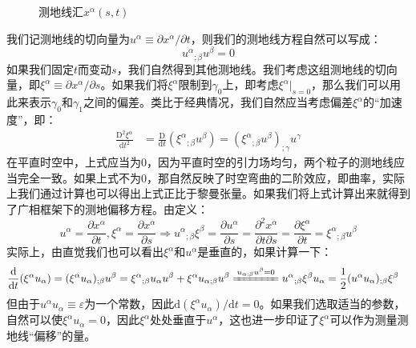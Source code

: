 \documentclass[hyperref, UTF8, a4paper]{ctexart}
\begin{document}
\begin{figure}
	\centering
	
	\caption{测地线汇$x^{\alpha }( s,t)$}
	\label{geodesic cong}
\end{figure}
我们记测地线的切向量为$u^{\alpha } \equiv \partial x^{\alpha } /\partial t$，则我们的测地线方程自然可以写成：
\begin{equation*}
	u^{\alpha }{}_{;\beta } u^{\beta } =0
\end{equation*}
如果我们固定$t$而变动$s$，我们自然得到其他测地线。我们考虑这组测地线的切向量，即$\xi ^{\alpha } \equiv \partial x^{\alpha } /\partial s$。如果我们将$\xi ^{\alpha }$限制到$\gamma _{0}$上，即考虑$\xi ^{\alpha }| _{s=0}$，那么我们可以用此来表示$\gamma _{0}$和$\gamma _{1}$之间的偏差。类比于经典情况，我们自然应当考虑偏差$\xi ^{\alpha }$的“加速度”，即：
\begin{equation*}
	\begin{aligned}
		\frac{\mathrm{D}^{2} \xi ^{\alpha }}{\mathrm{d} t^{2}} & =\frac{\mathrm{D}}{\mathrm{d} t} ( \xi ^{\alpha }{}_{;\beta } u^{\beta } )=( \xi ^{\alpha }{}_{;\beta } u^{\beta } )_{;\gamma } u^{\gamma }
	\end{aligned}
\end{equation*}
在平直时空中，上式应当为$0$，因为平直时空的引力场均匀，两个粒子的测地线应当完全一致。如果上式不为$0$，那自然反映了时空弯曲的二阶效应，即曲率，实际上我们通过计算也可以得出上式正比于黎曼张量。如果我们将上式计算出来就得到了广相框架下的测地偏移方程。由定义：
\begin{equation*}
	u^{\alpha } =\frac{\partial x^{\alpha }}{\partial t} ,\xi ^{\alpha } =\frac{\partial x^{\alpha }}{\partial s} \Rightarrow u^{\alpha }{}_{;\beta } \xi ^{\beta } =\frac{\partial u^{\alpha }}{\partial s} =\frac{\partial ^{2} x^{\alpha }}{\partial t\partial s} =\frac{\partial \xi ^{\alpha }}{\partial t} =\xi ^{\alpha }{}_{;\beta } u^{\beta }
\end{equation*}
实际上，由直觉我们也可以看出$\xi ^{\alpha }$和$u^{\alpha }$是垂直的，如果计算一下：
\begin{equation*}
	\begin{aligned}
		\frac{\mathrm{d}}{\mathrm{d} t} ( \xi ^{\alpha } u_{\alpha } ) & =(\xi ^{\alpha } u_{\alpha } )_{;\beta } u^{\beta } =\xi ^{\alpha }{}_{;\beta } u_{\alpha } u^{\beta } +\xi ^{\alpha } u_{\alpha ;\beta } u^{\beta }\xlongequal{u_{\alpha ;\beta } u^{\beta } =0} u^{\alpha }{}_{;\beta } \xi ^{\beta } u_{\alpha } =\frac{1}{2} (u^{\alpha } u_{\alpha } )_{;\beta } \xi ^{\beta }
	\end{aligned}
\end{equation*}
但由于$u^{\alpha } u_{\alpha } \equiv \varepsilon $为一个常数，因此$\mathrm{d} (\xi ^{\alpha } u_{\alpha } )/\mathrm{d} t=0$。如果我们选取适当的参数，自然可以使$\xi ^{\alpha } u_{\alpha } =0$，因此$\xi ^{\alpha }$处处垂直于$u^{\alpha }$，这也进一步印证了$\xi ^{\alpha }$可以作为测量测地线“偏移”的量。
\end{document}
